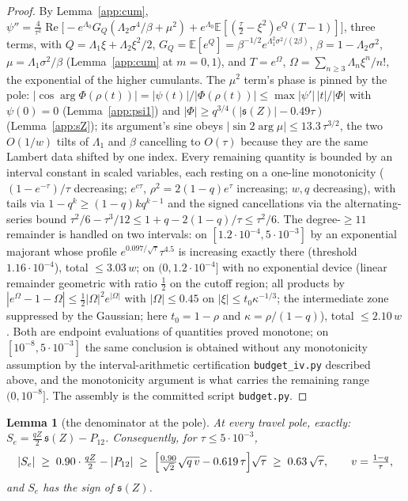 \documentclass[11pt]{article}
\theoremstyle{plain}
\newtheorem{lemma}[theorem]{Lemma}
\theoremstyle{definition}
\theoremstyle{remark}
\begin{document}
\begin{proof}
By Lemma~\ref{app:cum},
$\psi''=\frac4{\tau^2}\operatorname{Re}\bigl[-e^{\Lambda_0}G_Q(\Lambda_2\sigma^4/\beta+\mu^2)
+e^{\Lambda_0}\mathbb{E}[(\tfrac\tau2-\xi^2)e^{Q}(T-1)]\bigr]$, three terms, with
$Q=\Lambda_1\xi+\Lambda_2\xi^2/2$, $G_Q=\mathbb{E}[e^Q]=\beta^{-1/2}e^{\Lambda_1^2\sigma^2/(2\beta)}$,
$\beta=1-\Lambda_2\sigma^2$, $\mu=\Lambda_1\sigma^2/\beta$ (Lemma~\ref{app:cum} at $m=0,1$), and
$T=e^\Omega$, $\Omega=\sum_{n\ge3}\Lambda_n\xi^n/n!$, the exponential of the higher cumulants. The $\mu^2$
term's phase is pinned by the pole:
$|\cos\arg\Phi(\rho(t))|=|\psi(t)|/|\Phi(\rho(t))|\le\max|\psi'|\,|t|/|\Phi|$ with $\psi(0)=0$
(Lemma~\ref{app:psi1}) and $|\Phi|\ge q^{3/4}(|\mathfrak s(Z)|-0.49\tau)$ (Lemma~\ref{app:sZ});
its argument's sine obeys $|\sin2\arg\mu|\le13.3\,\tau^{3/2}$, the two $O(1/w)$ tilts of
$\Lambda_1$ and $\beta$ cancelling to $O(\tau)$ because they are the same Lambert data shifted by
one index. Every remaining quantity is bounded by an interval constant in scaled variables, each
resting on a one-line monotonicity ($(1-e^{-\tau})/\tau$ decreasing; $e^{c\tau}$, $\rho^2=2(1-q)e^\tau$
increasing; $w,q$ decreasing), with tails via $1-q^k\ge(1-q)kq^{k-1}$ and the signed cancellations
via the alternating-series bound $\tau^2/6-\tau^3/12\le1+q-2(1-q)/\tau\le\tau^2/6$. The
degree-$\ge11$ remainder is handled on two intervals: on $[1.2\cdot10^{-4},5\cdot10^{-3}]$ by an
exponential majorant whose profile $e^{0.097/\sqrt\tau}\tau^{4.5}$ is increasing exactly there
(threshold $1.16\cdot10^{-4}$), total $\le3.03\,w$; on $(0,1.2\cdot10^{-4}]$ with no exponential
device (linear remainder geometric with ratio $\tfrac12$ on the cutoff region; all products by
$|e^\Omega-1-\Omega|\le\tfrac12|\Omega|^2e^{|\Omega|}$ with $|\Omega|\le0.45$ on $|\xi|\le t_0\kappa^{-1/3}$; the
intermediate zone suppressed by the Gaussian; here $t_0=1-\rho$ and $\kappa=\rho/(1-q)$),
total $\le2.10\,w$. Both are endpoint evaluations of quantities proved monotone; on
$[10^{-8},5\cdot10^{-3}]$ the same conclusion is obtained without any monotonicity assumption by
the interval-arithmetic certification \texttt{budget\_iv.py} described above, and the monotonicity
argument is what carries the remaining range $(0,10^{-8}]$. The assembly is the committed script
\texttt{budget.py}.
\end{proof}

\begin{lemma}[the denominator at the pole]\label{app:Se}
At every travel pole, exactly: $S_e=\tfrac{qZ}2\,\mathfrak s(Z)-P_{12}$. Consequently, for
$\tau\le5\cdot10^{-3}$,
\[
 |S_e|\;\ge\;0.90\cdot\tfrac{qZ}2-|P_{12}|\;\ge\;
 \Bigl[\tfrac{0.90}{\sqrt2}\sqrt{q\,v}-0.619\,\tau\Bigr]\sqrt\tau\;\ge\;0.63\,\sqrt\tau,
 \qquad v=\tfrac{1-q}\tau,
\]
and $S_e$ has the sign of $\mathfrak s(Z)$.
\end{lemma}
\end{document}
